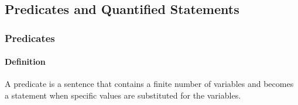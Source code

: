 \subsection{Predicates and Quantified Statements}
\hrulefill

\subsubsection*{Predicates}
\paragraph*{Definition}
A predicate is a sentence that contains a finite number of variables and becomes
a statement when specific values are substituted for the variables.
